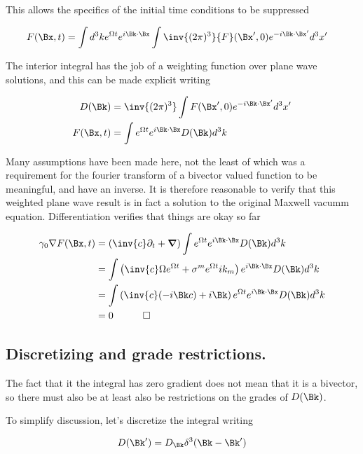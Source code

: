 This allows the specifics of the initial time conditions to be suppressed

\begin{align}
F(\Bx,t) &= \int d^3 k e^{\Omega t} e^{i \Bk \cdot \Bx} \int \inv{(2\pi)^3} {F}(\Bx',0) e^{-i \Bk \cdot \Bx'}  d^3 x'
\end{align}

The interior integral has the job of a weighting function over plane wave solutions, and this can be made explicit writing

\begin{align}
D(\Bk) &= \inv{(2\pi)^3} \int {F}(\Bx',0) e^{-i \Bk \cdot \Bx'}  d^3 x' \\
F(\Bx,t) &= \int e^{\Omega t} e^{i \Bk \cdot \Bx} D(\Bk) d^3 k
\end{align}

Many assumptions have been made here, not the least of which was a requirement for the fourier transform of a bivector valued function to be meaningful, and have an inverse.  It is therefore reasonable to verify that this weighted plane wave result is in fact a solution to the original Maxwell vacumm equation.  Differentiation verifies that things are okay so far

\begin{align*}
\gamma_0 \grad F(\Bx,t)
&=
\left(\inv{c}\partial_t + \spacegrad \right)\int e^{\Omega t} e^{i \Bk \cdot \Bx} D(\Bk) d^3 k \\
&=
\int \left(\inv{c}\Omega e^{\Omega t} + \sigma^m e^{\Omega t} i k_m \right) e^{i \Bk \cdot \Bx} D(\Bk) d^3 k \\
&=
\int \left(\inv{c}(-i \Bk c) + i \Bk \right) e^{\Omega t} e^{i \Bk \cdot \Bx} D(\Bk) d^3 k \\
&= 0 \quad\quad\quad\square
\end{align*}

\subsection{Discretizing and grade restrictions.}

The fact that it the integral has zero gradient does not mean that it is a bivector, so there must
also be at least also be restrictions on the grades of $D(\Bk)$.

To simplify discussion, let's discretize the integral writing

\begin{align*}
D(\Bk') = D_\Bk \delta^3 (\Bk - \Bk')
\end{align*}


